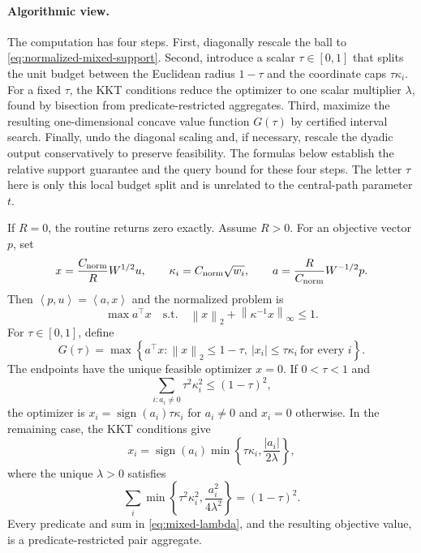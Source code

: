 \documentclass[11pt]{article}
\theoremstyle{definition}
\newcommand{\norm}[1]{\left\lVert #1\right\rVert}
\newcommand{\set}[1]{\left\{#1\right\}}
\newcommand{\ip}[2]{\left\langle #1,#2\right\rangle}
\begin{document}
\paragraph{Algorithmic view.}
The computation has four steps.  First, diagonally rescale the ball to
\eqref{eq:normalized-mixed-support}.  Second, introduce a scalar
$\tau\in[0,1]$ that splits the unit budget between the Euclidean radius
$1-\tau$ and the coordinate caps $\tau\kappa_i$.  For a fixed $\tau$, the KKT
conditions reduce the optimizer to one scalar multiplier $\lambda$, found by
bisection from predicate-restricted aggregates.  Third, maximize the resulting
one-dimensional concave value function $G(\tau)$ by certified interval
search.  Finally, undo the diagonal scaling and, if necessary, rescale
the dyadic output conservatively to preserve feasibility.  The formulas
below establish the relative support guarantee and the
query bound for these four steps.  The letter $\tau$ here is only this local
budget split and is unrelated to the central-path parameter $t$.

If $R=0$, the routine returns zero exactly.  Assume $R>0$.  For an objective
vector $p$, set
\[
 x=\frac{C_{\rm norm}}R W^{1/2}u,
 \qquad \kappa_i=C_{\rm norm}\sqrt{w_i},
 \qquad a=\frac{R}{C_{\rm norm}}W^{-1/2}p.
\]
Then $\ip{p}{u}=\ip{a}{x}$ and the normalized problem is
\begin{equation}\label{eq:normalized-mixed-support}
 \max a^\top x
 \quad\text{s.t.}\quad
 \norm{x}_2+\norm{\kappa^{-1}x}_\infty\le1.
\end{equation}
For $\tau\in[0,1]$, define
\begin{equation}\label{eq:mixed-value-function}
 G(\tau)=\max\set{a^\top x:\norm{x}_2\le1-\tau,
                         \ |x_i|\le \tau\kappa_i\ \text{for every }i}.
\end{equation}
The endpoints have the unique feasible optimizer $x=0$.  If
$0<\tau<1$ and
\[
 \sum_{i:a_i\ne0}\tau^2\kappa_i^2\le(1-\tau)^2,
\]
the optimizer is
$x_i=\operatorname{sign}(a_i)\tau\kappa_i$ for $a_i\ne0$ and
$x_i=0$ otherwise.  In the remaining case, the KKT conditions give
\begin{equation}\label{eq:mixed-kkt}
 x_i=\operatorname{sign}(a_i)
       \min\set{\tau\kappa_i,\frac{|a_i|}{2\lambda}},
\end{equation}
where the unique $\lambda>0$ satisfies
\begin{equation}\label{eq:mixed-lambda}
 \sum_i\min\set{\tau^2\kappa_i^2,\frac{a_i^2}{4\lambda^2}}
       =(1-\tau)^2.
\end{equation}
Every predicate and sum in \eqref{eq:mixed-lambda}, and the resulting
objective value, is a predicate-restricted pair aggregate.
\end{document}
